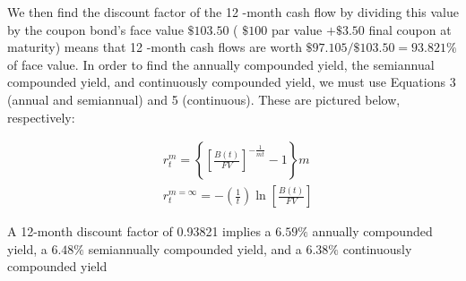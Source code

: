 \documentclass[11pt]{article}
\begin{document}
We then find the discount factor of the 12 -month cash flow by dividing this value by the coupon bond's face value $\$ 103.50$ ( $\$ 100$ par value $+\$ 3.50$ final coupon at maturity) means that 12 -month cash flows are worth $\$ 97.105 / \$ 103.50=93.821 \%$ of face value. In order to find the annually compounded yield, the semiannual compounded yield, and continuously compounded yield, we must use Equations 3 (annual and semiannual) and 5 (continuous). These are pictured below, respectively:

$$
\begin{aligned}
& r_{t}^{m}=\left\{\left[\frac{B(t)}{F V}\right]^{-\frac{1}{m t}}-1\right\} m \\
& r_{t}^{m=\infty}=-\left(\frac{1}{t}\right) \ln \left[\frac{B(t)}{F V}\right]
\end{aligned}
$$

A 12-month discount factor of 0.93821 implies a $6.59 \%$ annually compounded yield, a $6.48 \%$ semiannually compounded yield, and a $6.38 \%$ continuously compounded yield
\end{document}
